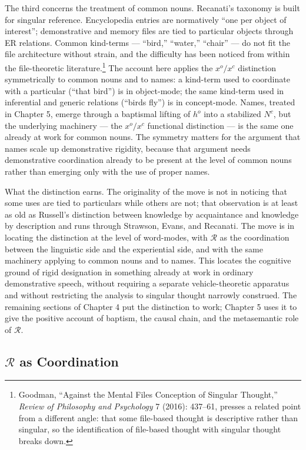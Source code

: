 \documentclass[12pt,a4paper]{article}
\begin{document}
The third concerns the treatment of common nouns. Recanati's taxonomy is built for singular reference. Encyclopedia entries are normatively ``one per object of interest''; demonstrative and memory files are tied to particular objects through ER relations. Common kind-terms --- ``bird,'' ``water,'' ``chair'' --- do not fit the file architecture without strain, and the difficulty has been noticed from within the file-theoretic literature.\footnote{Goodman, ``Against the Mental Files Conception of Singular Thought,'' \emph{Review of Philosophy and Psychology} 7 (2016): 437--61, presses a related point from a different angle: that some file-based thought is descriptive rather than singular, so the identification of file-based thought with singular thought breaks down.} The account here applies the \(x^o/x^c\) distinction symmetrically to common nouns and to names: a kind-term used to coordinate with a particular (``that bird'') is in object-mode; the same kind-term used in inferential and generic relations (``birds fly'') is in concept-mode. Names, treated in Chapter 5, emerge through a baptismal lifting of \(h^o\) into a stabilized \(N^c\), but the underlying machinery --- the \(x^o/x^c\) functional distinction --- is the same one already at work for common nouns. The symmetry matters for the argument that names scale up demonstrative rigidity, because that argument needs demonstrative coordination already to be present at the level of common nouns rather than emerging only with the use of proper names.

What the distinction earns. The originality of the move is not in noticing that some uses are tied to particulars while others are not; that observation is at least as old as Russell's distinction between knowledge by acquaintance and knowledge by description and runs through Strawson, Evans, and Recanati. The move is in locating the distinction at the level of word-modes, with \(\mathcal{R}\) as the coordination between the linguistic side and the experiential side, and with the same machinery applying to common nouns and to names. This locates the cognitive ground of rigid designation in something already at work in ordinary demonstrative speech, without requiring a separate vehicle-theoretic apparatus and without restricting the analysis to singular thought narrowly construed. The remaining sections of Chapter 4 put the distinction to work; Chapter 5 uses it to give the positive account of baptism, the causal chain, and the metasemantic role of \(\mathcal{R}\).

\subsection{\texorpdfstring{\(\mathcal{R}\) as Coordination}{\textbackslash mathcal\{R\} as Coordination}}\label{mathcalr-as-coordination}
\end{document}
